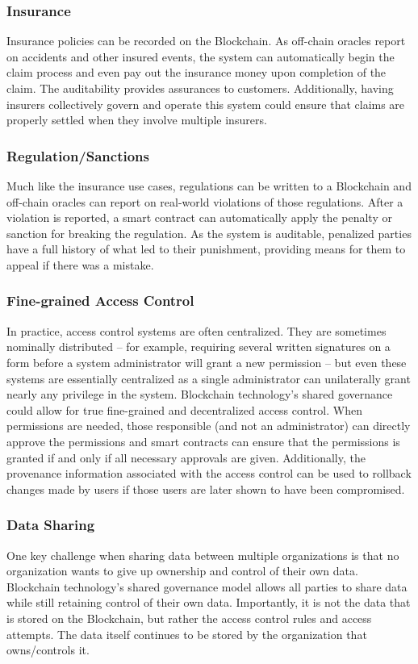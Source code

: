 \subsubsection{Insurance}
Insurance policies can be recorded on the Blockchain.
As off-chain oracles report on accidents and other insured events, the system can automatically begin the claim process and even pay out the insurance money upon completion of the claim.
The auditability provides assurances to customers.
Additionally, having insurers collectively govern and operate this system could ensure that claims are properly settled when they involve multiple insurers.

\subsubsection{Regulation/Sanctions}
Much like the insurance use cases, regulations can be written to a Blockchain and off-chain oracles can report on real-world violations of those regulations.
After a violation is reported, a smart contract can automatically apply the penalty or sanction for breaking the regulation.
As the system is auditable, penalized parties have a full history of what led to their punishment, providing means for them to appeal if there was a mistake.

\subsubsection{Fine-grained Access Control}
In practice, access control systems are often centralized. They are sometimes nominally distributed -- for example, requiring several written signatures on a form before a system administrator will grant a new permission -- but even these systems are essentially centralized as a single administrator can unilaterally grant nearly any privilege in the system.
Blockchain technology's shared governance could allow for true fine-grained and decentralized access control.
When permissions are needed, those responsible (and not an administrator) can directly approve the permissions and smart contracts can ensure that the permissions is granted if and only if all necessary approvals are given.
Additionally, the provenance information associated with the access control can be used to rollback changes made by users if those users are later shown to have been compromised.

\subsubsection{Data Sharing}
One key challenge when sharing data between multiple organizations is that no organization wants to give up ownership and control of their own data.
Blockchain technology's shared governance model allows all parties to share data while still retaining control of their own data.
Importantly, it is not the data that is stored on the Blockchain, but rather the access control rules and access attempts.
The data itself continues to be stored by the organization that owns/controls it.

